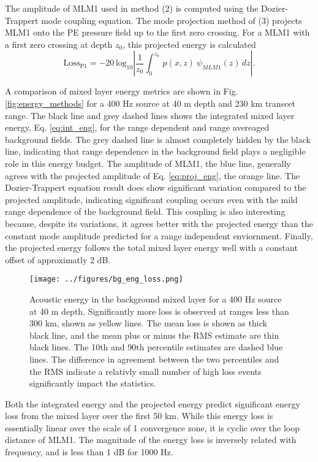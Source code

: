 \documentclass[preprint,NumberedRefs]{JASA}
\begin{document}
The amplitude of MLM1 used in method (2) is computed using the Dozier-Trappert mode coupling equation. The mode projection method of (3) projects MLM1 onto the PE pressure field up to the first zero crossing. For a MLM1 with a first zero crossing at depth $z_0$, this projected energy is calculated
\begin{equation}
    \textrm{Loss}_{\textrm{P1}} = -20 \, \textrm{log}_{10} \left| \frac{1}{z_0} \int^{z_0}_0 \, p(x, z) \ \psi_{MLM1}(z) \,  dz \right|.
    \label{eq:proj_eng}
\end{equation}

A comparison of mixed layer energy metrics are shown in Fig. \ref{fig:energy_methods} for a 400 Hz source at 40 m depth and 230 km transcet range. The black line and grey dashed lines shows the integrated mixed layer energy, Eq. \eqref{eq:int_eng}, for the range dependent and range avereaged background fields. The grey dashed line is almost completely hidden by the black line, indicating that range dependence in the background field plays a negligible role in this energy budget. The amplitude of MLM1, the blue line, generally agrees with the projected amplitude of Eq. \eqref{eq:proj_eng}, the orange line. The Dozier-Trappert equation result does show significant variation compared to the projected amplitude, indicating significant coupling occurs even with the mild range dependence of the background field. This coupling is also interesting because, despite its variations, it agrees better with the projected energy than the constant mode amplitude predicted for a range independent enviornment. Finally, the projected energy follows the total mixed layer energy well with a constant offset of approximatly 2 dB.

\begin{figure}
\texttt{[image: ../figures/bg\_eng\_loss.png]}
    \caption{Acoustic energy in the background mixed layer for a 400 Hz source at 40 m depth. Significantly more loss is observed at ranges less than 300 km, shown as yellow lines. The mean loss is shown as thick black line, and the mean plus or minus the RMS estimate are thin black lines. The 10th and 90th percentile estimates are dashed blue lines. The difference in agreement between the two percentiles and the RMS indicate a relativly small number of high loss events significantly impact the statistics.}
    \label{fig:bg_eng}
\end{figure}
Both the integrated energy and the projected energy predict significant energy loss from the mixed layer over the first 50 km. While this energy loss is essentially linear over the scale of 1 convergence zone, it is cyclic over the loop distance of MLM1. The magnitude of the energy loss is inversely related with frequency, and is less than 1 dB for 1000 Hz.
\end{document}
